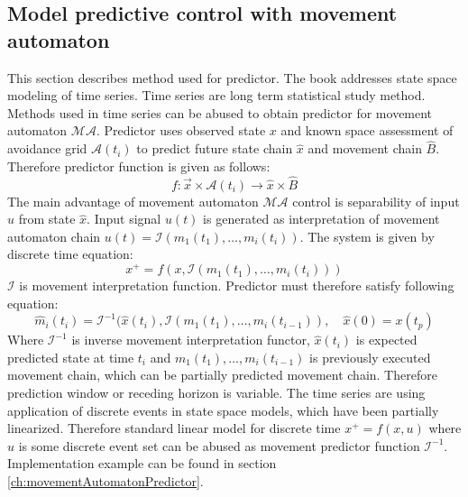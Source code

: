 \subsection{Model predictive control with movement automaton}
\noindent This section describes method used for predictor. The book \cite{durbin2012time} addresses state space modeling of time series. Time series are long term statistical study method. Methods used in time series can be abused to obtain predictor for movement automaton $\mathscr{MA}$. Predictor uses observed state $x$ and known space assessment of avoidance grid $\mathscr{A}(t_i)$ to predict future state chain $\hat{x}$ and movement chain $\hat{B}$. Therefore predictor function is given as follows:
\begin{equation}\label{eq:predictorGlobalForm}
    f:\vec{x}\times \mathscr{A}(t_i)\to \hat{x}\times\hat{B}
\end{equation}
\noindent The main advantage of movement automaton $\mathscr{MA}$ control is separability of input $u$ from state $\hat{x}$. Input signal $u(t)$ is generated as interpretation of movement automaton chain $u(t)=\mathscr{I}(m_1(t_1),\dots,m_i(t_i))$. The system is given by discrete time equation:
\begin{equation}
    x^+= f(x,\mathscr{I}(m_1(t_1),\dots,m_i(t_i)))
\end{equation}
\noindent $\mathscr{I}$ is movement interpretation function. Predictor must therefore satisfy following equation:
\begin{equation}
    \hat{m}_i(t_i) =\mathscr{I}^{-1}(\hat{x}(t_i),\mathscr{I}(m_1(t_1),\dots,m_i(t_{i-1})),\quad \hat{x}(0) = x(t_p)
\end{equation}
\noindent Where $\mathscr{I}^{-1}$ is inverse movement interpretation functor, $\hat{x}(t_i)$ is expected predicted state at time $t_i$ and $m_1(t_1),\dots,m_i(t_{i-1})$ is previously executed movement chain, which can be partially predicted movement chain. Therefore prediction window or receding horizon is variable. The time series are using application of discrete events in state space models, which have been partially linearized. Therefore standard linear model for discrete time $x^+=f(x,u)$ where $u$ is some discrete event set can be abused as movement predictor function  $\mathscr{I}^{-1}$. Implementation example can be found in section \ref{ch:movementAutomatonPredictor}.

